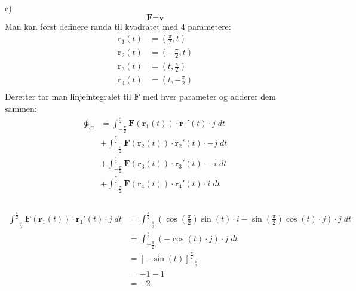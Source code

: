 \documentclass[12pt, a4paper]{article}
\begin{document}
c) \\
\begin{equation}
    \textbf{F} = \textbf{v}
\end{equation}
Man kan først definere randa til kvadratet med $4$ parametere:
\begin{equation}
    \begin{split}
        \textbf{r}_1(t) &= \left(\frac{\pi}{2}, t \right) \\
        \textbf{r}_2(t) &= \left(-\frac{\pi}{2}, t \right) \\
        \textbf{r}_3(t) &= \left(t, \frac{\pi}{2} \right) \\
        \textbf{r}_4(t) &= \left(t, -\frac{\pi}{2} \right) \\
    \end{split}
\end{equation}
Deretter tar man linjeintegralet til $\textbf{F}$ med hver parameter og adderer dem sammen: \\
\begin{equation}
    \begin{split}
        \ointctrclockwise_C &= \int_{-\frac{\pi}{2}}^{\frac{\pi}{2}} \textbf{F}(\textbf{r}_1(t)) \cdot \textbf{r}_1'(t) \cdot j \; dt \\
                        &+ \int_{-\frac{\pi}{2}}^{\frac{\pi}{2}} \textbf{F}(\textbf{r}_2(t)) \cdot \textbf{r}_2'(t) \cdot -j \; dt \\
                        &+ \int_{-\frac{\pi}{2}}^{\frac{\pi}{2}} \textbf{F}(\textbf{r}_3(t)) \cdot \textbf{r}_3'(t) \cdot -i \; dt \\
                        &+ \int_{-\frac{\pi}{2}}^{\frac{\pi}{2}} \textbf{F}(\textbf{r}_4(t)) \cdot \textbf{r}_4'(t) \cdot i \; dt \\
    \end{split}
\end{equation} \\
\begin{equation}
    \begin{split}
        \int_{-\frac{\pi}{2}}^{\frac{\pi}{2}} \textbf{F}(\textbf{r}_1(t)) \cdot \textbf{r}_1'(t) \cdot j \; dt &= \int_{-\frac{\pi}{2}}^{\frac{\pi}{2}} (\cos\left(\frac{\pi}{2}\right)\sin(t) \cdot i - \sin\left(\frac{\pi}{2}\right)\cos(t) \cdot j) \cdot j \; dt \\
        &= \int_{-\frac{\pi}{2}}^{\frac{\pi}{2}} (- \cos(t) \cdot j) \cdot j \; dt \\
        &= \left[- \sin(t) \right]_{-\frac{\pi}{2}}^{\frac{\pi}{2}} \\
        &= - 1 - 1 \\
        &= -2
    \end{split}
\end{equation}
\end{document}
